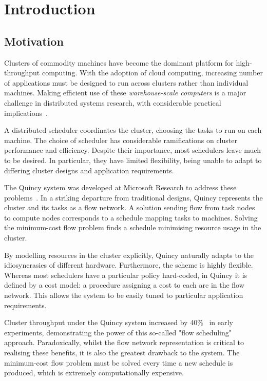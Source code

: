 \chapter{Introduction} \label{chap:intro}


\section{Motivation} \label{sec:intro-motivation}
Clusters of commodity machines have become the dominant platform for high-throughput computing. With the adoption of cloud computing, increasing number of applications must be designed to run across clusters rather than individual machines. Making efficient use of these \emph{warehouse-scale computers} is a major challenge in distributed systems research, with considerable practical implications~\cite{WarehouseScale:2009}.

A distributed scheduler coordinates the cluster, choosing the tasks to run on each machine. The choice of scheduler has considerable ramifications on cluster performance and efficiency. Despite their importance, most schedulers leave much to be desired. In particular, they have limited flexibility, being unable to adapt to differing cluster designs and application requirements.

The Quincy system was developed at Microsoft Research to address these problems~\cite{Isard:2009}. In a striking departure from traditional designs, Quincy represents the cluster and its tasks as a flow network. A solution sending flow from task nodes to compute nodes corresponds to a schedule mapping tasks to machines. Solving the minimum-cost flow problem finds a schedule minimising resource usage in the cluster.

By modelling resources in the cluster explicitly, Quincy naturally adapts to the idiosyncrasies of different hardware. Furthermore, the scheme is highly flexible. Whereas most schedulers have a particular policy hard-coded, in Quincy it is defined by a cost model: a procedure assigning a cost to each arc in the flow network. This allows the system to be easily tuned to particular application requirements.

Cluster throughput under the Quincy system increased by  40\%~\cite{Isard:2009} in early experiments, demonstrating the power of this so-called "flow scheduling" approach. Paradoxically, whilst the flow network representation is critical to realising these benefits, it is also the greatest drawback to the system. The minimum-cost flow problem must be solved every time a new schedule is produced, which is extremely computationally expensive.

